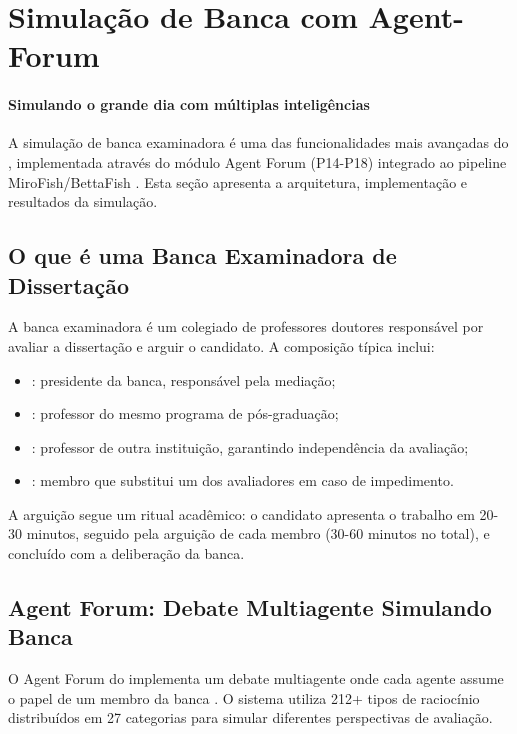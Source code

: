 \section{Simulação de Banca com Agent-Forum}
\label{sec:simulacao-banca-agent-forum}
\nivelphd

\paragraph{Simulando o grande dia com múltiplas inteligências} A simulação de banca examinadora é uma das funcionalidades mais avançadas do
\opencodeeco{}, implementada através do módulo Agent Forum (P14-P18) integrado
ao pipeline MiroFish/BettaFish \cite{opencode2026ecosystem, opencode2026spec036}.
Esta seção apresenta a arquitetura, implementação e resultados da simulação.

\subsection{O que é uma Banca Examinadora de Dissertação}

A banca examinadora é um colegiado de professores doutores responsável por
avaliar a dissertação e arguir o candidato. A composição típica inclui:

\begin{itemize}
\item {}: presidente da banca, responsável pela mediação;
\item {}: professor do mesmo programa de
      pós-graduação;
\item {}: professor de outra instituição, garantindo
      independência da avaliação;
\item {}: membro que substitui um dos avaliadores em caso de
      impedimento.
\end{itemize}

A arguição segue um ritual acadêmico: o candidato apresenta o trabalho em 20-30
minutos, seguido pela arguição de cada membro (30-60 minutos no total), e
concluído com a deliberação da banca.

\subsection{Agent Forum: Debate Multiagente Simulando Banca}

O Agent Forum do \opencodeeco{} implementa um debate multiagente onde cada
agente assume o papel de um membro da banca \cite{wooldridge2009multiagent}.
O sistema utiliza 212+ tipos de raciocínio distribuídos em 27 categorias para
simular diferentes perspectivas de avaliação.

